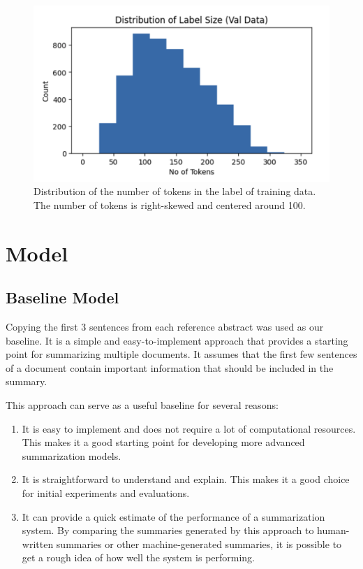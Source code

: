 \documentclass[12pt, twocolumn]{article}
\numberwithin{equation}{section}
\begin{document}
\begin{figure}
    \includegraphics[width=\textwidth]{label_dist.png}
    \caption{Distribution of the number of tokens in the label of training data. The number of tokens is right-skewed and centered around 100.}
    \label{fig:label-dist}
\end{figure}

\section{Model}
\label{app:model}

\subsection{Baseline Model}
\label{app:model-baseline}

Copying the first 3 sentences from each reference abstract was used as our baseline. It is a simple and easy-to-implement approach that provides a starting point for summarizing multiple documents. It assumes that the first few sentences of a document contain important information that should be included in the summary.

This approach can serve as a useful baseline for several reasons:

\begin{enumerate}
    \item It is easy to implement and does not require a lot of computational resources. This makes it a good starting point for developing more advanced summarization models.
    \item It is straightforward to understand and explain. This makes it a good choice for initial experiments and evaluations.
    \item It can provide a quick estimate of the performance of a summarization system. By comparing the summaries generated by this approach to human-written summaries or other machine-generated summaries, it is possible to get a rough idea of how well the system is performing.
\end{enumerate}
\end{document}

